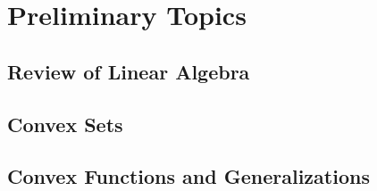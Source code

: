 \part{Preliminary Topics}
	\chapter{Review of Linear Algebra}

	\chapter{Convex Sets}

	\chapter{Convex Functions and Generalizations}